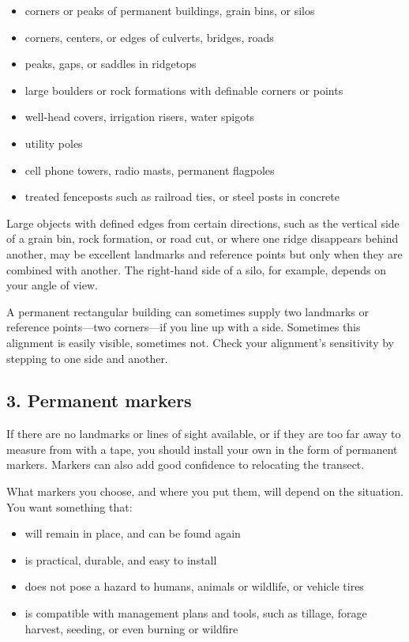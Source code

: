 \documentclass[11pt,letterpaper,twoside,onecolumn]{memoir}
\begin{document}
\begin{itemize}
\item corners or peaks of permanent buildings, grain bins, or silos

\item corners, centers, or edges of culverts, bridges, roads

\item peaks, gaps, or saddles in ridgetops

\item large boulders or rock formations with definable corners or points

\item well-head covers, irrigation risers, water spigots

\item utility poles

\item cell phone towers, radio masts, permanent flagpoles

\item treated fenceposts such as railroad ties, or steel posts in concrete
\end{itemize}

Large objects with defined edges from certain directions, such as the vertical side of a grain bin, rock formation, or road cut, or where one ridge disappears behind another, may be excellent landmarks and reference points but only when they are combined with another. The right-hand side of a silo, for example, depends on your angle of view.

A permanent rectangular building can sometimes supply two landmarks or reference points---two corners---if you line up with a side. Sometimes this alignment is easily visible, sometimes not. Check your alignment's sensitivity by stepping to one side and another. 

\subsection*{3. Permanent markers}

If there are no landmarks or lines of sight available, or if they are too far away to measure from with a tape, you should install your own in the form of permanent markers. Markers can also add good confidence to relocating the transect.

What markers you choose, and where you put them, will depend on the situation. You want something that:

\begin{itemize}
\item will remain in place, and can be found again
\item is practical, durable, and easy to install
\item does not pose a hazard to humans, animals or wildlife, or vehicle tires
\item is compatible with management plans and tools, such as tillage, forage harvest, seeding, or even burning or wildfire
\end{itemize}
\end{document}
